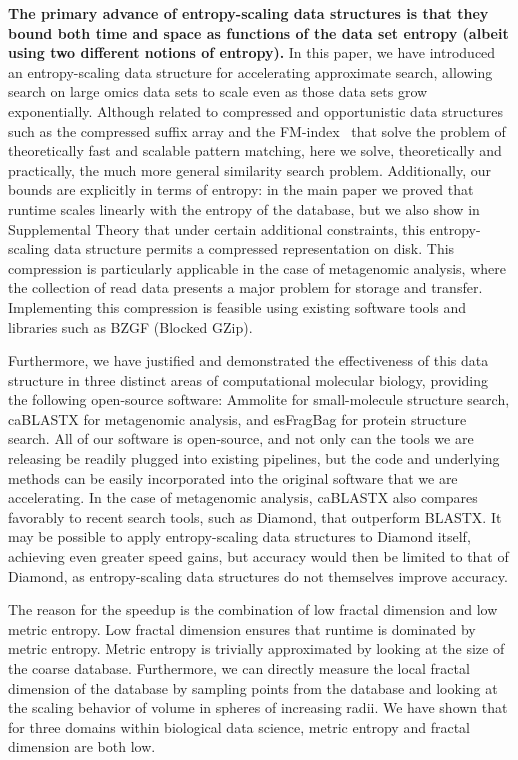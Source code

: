 \documentclass[review,preprint,12pt]{elsarticle}
\renewcommand{\cite}{\citep} %
\theoremstyle{definition}
\theoremstyle{remark}
\numberwithin{equation}{section}
\begin{document}
\textbf{The primary advance of entropy-scaling data structures is that they bound both time and space as functions of the data set entropy (albeit using two different notions of entropy).}
In this paper, we have introduced an entropy-scaling data structure for accelerating approximate search,
allowing search on large omics data sets to scale even as those data sets grow exponentially.
Although related to compressed and opportunistic data structures such as the compressed suffix array and the FM-index~\cite{grossi2005compressed, ferragina2000opportunistic} that solve the problem of 
theoretically fast and scalable pattern matching,
here we solve, theoretically and practically, the much more general similarity 
search problem.
Additionally, our bounds are explicitly in terms of entropy: in the main paper we proved that runtime scales linearly with the entropy of the 
database, but we also show in Supplemental Theory that under certain additional constraints, this entropy-scaling data structure permits a compressed 
representation on disk.
This compression is particularly applicable in the case of metagenomic analysis, where the collection of 
read data presents a major problem for storage and transfer.
Implementing this compression is feasible using existing software tools and libraries such as BZGF (Blocked GZip).

Furthermore, we have justified and demonstrated the effectiveness of this data structure in
three distinct areas of computational molecular biology, providing the
following open-source software: Ammolite for
small-molecule structure search, caBLASTX for metagenomic analysis, and esFragBag for protein structure search.
All of our software is open-source, and not only can the tools we are 
releasing be readily plugged into existing pipelines, but the code and 
underlying methods can be easily incorporated into the original 
software that we are accelerating.
In the case of metagenomic analysis, caBLASTX also compares favorably to recent 
search tools, such as Diamond, that outperform BLASTX.
It may be possible to apply entropy-scaling data
structures to Diamond itself, achieving even greater speed gains, but
accuracy would then be limited to that of Diamond,
as entropy-scaling data structures do not themselves 
improve accuracy.

The reason for the speedup is the combination of low fractal dimension and low metric entropy.
Low fractal dimension ensures that runtime is dominated by metric entropy.
Metric entropy is trivially approximated by looking at the size of the coarse database.
Furthermore, we can directly measure the local fractal dimension of the database by sampling points from the database and looking at the scaling behavior of volume in spheres of increasing radii.
We have shown that for three domains within biological data science, metric entropy and fractal dimension are both low.
\end{document}
